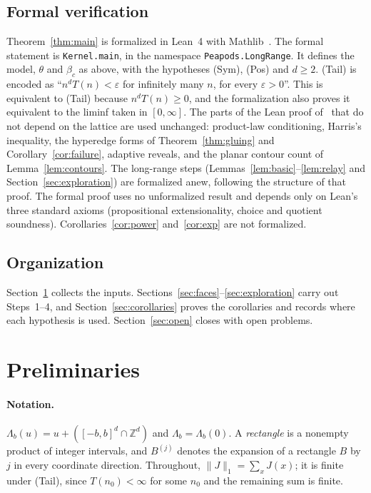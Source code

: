 \documentclass[11pt]{article}
\theoremstyle{definition}
\theoremstyle{remark}
\numberwithin{equation}{section}
\newcommand{\Z}{\mathbb Z}
\newcommand{\1}{\mathbf 1}
\newcommand{\Lam}{\Lambda}
\newcommand{\norm}[1]{\|#1\|}
\begin{document}
\subsection{Formal verification}\label{sec:formal}
Theorem~\ref{thm:main} is formalized in Lean~4 with Mathlib~\cite{PeiLean}. The formal
statement is \texttt{Kernel.main}, in the namespace \texttt{Peapods.LongRange}. It defines the model,
$\theta$ and $\beta_c$ as above, with the hypotheses (Sym), (Pos) and $d\ge2$. (Tail) is encoded as ``$n^dT(n)<\varepsilon$ for
infinitely many $n$, for every $\varepsilon>0$''. This is equivalent to (Tail) because $n^dT(n)\ge0$, and
the formalization also proves it equivalent to the liminf taken in $[0,\infty]$. The parts of the
Lean proof of~\cite{OpenAIZ3} that do not depend on the lattice are used unchanged: product-law
conditioning, Harris's inequality, the hyperedge forms of Theorem~\ref{thm:gluing} and
Corollary~\ref{cor:failure}, adaptive reveals, and the planar contour count of
Lemma~\ref{lem:contours}. The long-range steps (Lemmas~\ref{lem:basic}--\ref{lem:relay} and
Section~\ref{sec:exploration}) are formalized anew, following the structure of that proof. The
formal proof uses no unformalized result and depends only on Lean's three standard axioms
(propositional extensionality, choice and quotient soundness). Corollaries~\ref{cor:power} and~\ref{cor:exp} are not formalized.

\subsection{Organization}
Section~\ref{sec:prelim} collects the inputs. Sections~\ref{sec:faces}--\ref{sec:exploration} carry
out Steps~1--4, and Section~\ref{sec:corollaries} proves the corollaries and records where each
hypothesis is used. Section~\ref{sec:open} closes with open problems.

\section{Preliminaries}\label{sec:prelim}

\paragraph{Notation.} $\Lam_b(u)=u+([-b,b]^d\cap\Z^d)$ and $\Lam_b=\Lam_b(0)$. A \emph{rectangle}
is a nonempty product of integer intervals, and $B^{(j)}$ denotes the expansion of a rectangle $B$
by $j$ in every coordinate direction. Throughout, $\norm{J}_1=\sum_xJ(x)$; it is finite under (Tail),
since $T(n_0)<\infty$ for some $n_0$ and the remaining sum is finite.
\end{document}

